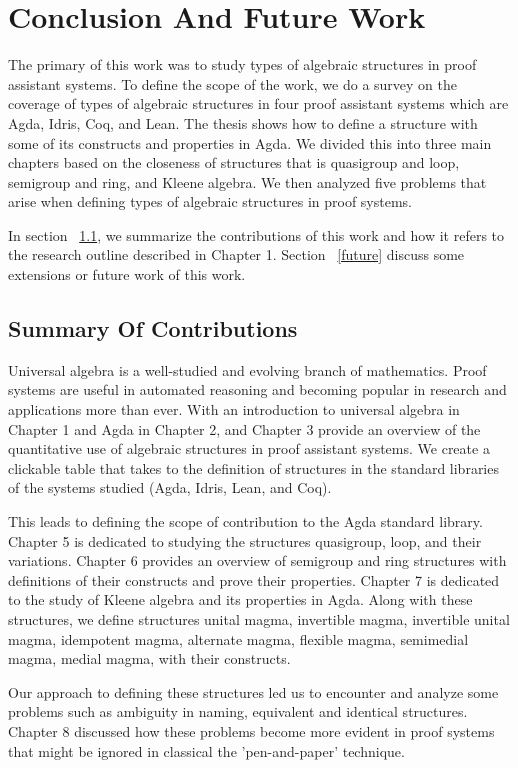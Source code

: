 \chapter{Conclusion And Future Work}
The primary of this work was to study types of algebraic structures in proof
assistant systems. To define the scope of the work, we do a survey on the
coverage of types of algebraic structures in four proof assistant systems which
are Agda, Idris, Coq, and Lean. The thesis shows how to define a structure with
some of its constructs and properties in Agda. We divided this into three main
chapters based on the closeness of structures that is quasigroup and loop,
semigroup and ring, and Kleene algebra. We then analyzed five problems that arise
when defining types of algebraic structures in proof systems.

In section ~\ref{contribution}, we summarize the contributions of this work and
how it refers to the research outline described in Chapter 1. Section
~\ref{future} discuss some extensions or future work of this work. 

\section{Summary Of Contributions}
\label{contribution}
Universal algebra is a well-studied and evolving branch of mathematics. Proof
systems are useful in automated reasoning and becoming popular in research and
applications more than ever. With an introduction to universal algebra in
Chapter 1 and Agda in Chapter 2, and Chapter 3 provide an overview of the
quantitative use of algebraic structures in proof assistant systems. We create a
clickable table that takes to the definition of structures in the standard
libraries of the systems studied (Agda, Idris, Lean, and Coq).

This leads to defining the scope of contribution to the Agda standard library.
Chapter 5 is dedicated to studying the structures quasigroup, loop, and their
variations. Chapter 6 provides an overview of semigroup and ring structures with
definitions of their constructs and prove their properties. Chapter 7 is
dedicated to the study of Kleene algebra and its properties in Agda. Along with
these structures, we define structures unital magma, invertible magma,
invertible unital magma, idempotent magma, alternate magma, flexible magma,
semimedial magma, medial magma, with their constructs.

Our approach to defining these structures led us to encounter and analyze some
problems such as ambiguity in naming, equivalent and identical structures.
Chapter 8 discussed how these problems become more evident in proof systems that
might be ignored in classical the 'pen-and-paper' technique.

